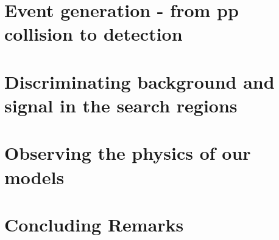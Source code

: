 \documentclass[12pt,a4paper]{report}
\begin{document}
\chapter{Event generation - from pp collision to detection}
\label{chap:5}




\chapter{Discriminating background and signal in the search regions}
\label{chap:6}


\chapter{Observing the physics of our models}
\label{chap:7}



\chapter{Concluding Remarks}


\clearpage





\end{document}
